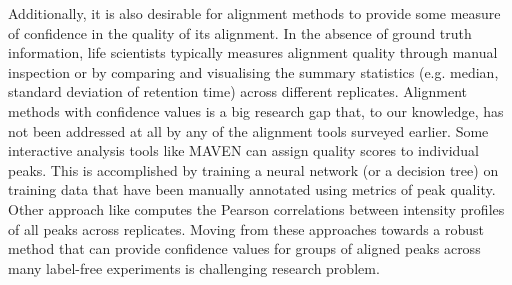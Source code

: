 Additionally, it is also desirable for alignment methods to provide some measure of confidence in the quality of its alignment. In the absence of ground truth information, life scientists typically measures alignment quality through manual inspection or by comparing and visualising the summary statistics (e.g. median, standard deviation of retention time) across different replicates. Alignment methods with confidence values is a big research gap that, to our knowledge, has not been addressed at all by any of the alignment tools surveyed earlier. Some interactive analysis tools like MAVEN \cite{Melamud2010} can assign quality scores to individual peaks. This is accomplished by training a neural network (or a decision tree) on training data that have been manually annotated using metrics of peak quality. Other approach like \cite{Brodsky2010} computes the Pearson correlations between intensity profiles of all peaks across replicates. Moving from these approaches towards a robust method that can provide confidence values for groups of aligned peaks across many label-free experiments is challenging research problem.

